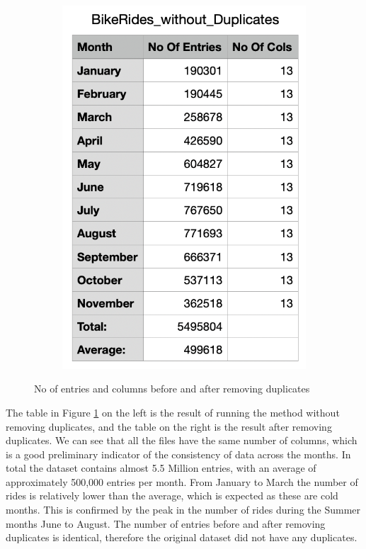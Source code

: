 \documentclass[12pt]{article}
\begin{document}
\begin{itemize}
\begin{figure}[h]
\begin{subfigure}{.4\textwidth}
		\includegraphics[scale=0.5]{img3.png}
	\end{subfigure}
	\caption{No of entries and columns before and after removing duplicates}
	\label{fig3}
	\end{figure}
	\pagebreak
	
The table in Figure \ref{fig3} on the left is the result of running the method without removing duplicates, and the table on the right is the result after removing duplicates. We can see that all the files have the same number of columns, which is a good preliminary indicator of the consistency of data across the months. In total the dataset contains almost 5.5 Million entries, with an average of approximately 500,000 entries per month. From January to March the number of rides is relatively lower than the average, which is expected as these are cold months. This is confirmed by the peak in the number of rides during the Summer months June to August. The number of entries before and after removing duplicates is identical, therefore the original dataset did not have any duplicates. \\


\end{itemize}
\end{document}
